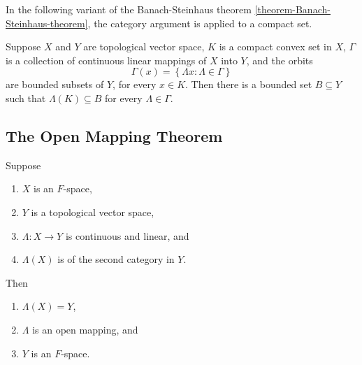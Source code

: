 In the following variant of the Banach-Steinhaus theorem \ref{theorem-Banach-Steinhaus-theorem}, the category argument is applied to a compact set.

\begin{theorem}
  Suppose \( X \) and \( Y \) are topological vector space, \( K \) is a compact convex set in \( X \), \( \Gamma \) is a collection of continuous linear mappings of \( X \) into \( Y \), and the orbits
  \[
    \Gamma(x) = \left\lbrace \Lambda x: \Lambda \in \Gamma \right\rbrace
  \]
  are bounded subsets of \( Y \), for every \( x \in K \).
  Then there is a bounded set \( B \subseteq Y \) such that \( \Lambda(K) \subseteq B \) for every \( \Lambda \in \Gamma \).
\end{theorem}

\subsection{The Open Mapping Theorem}
\label{subsection-the-open-mapping-theorem}

\begin{theorem}
  \label{theorem-the-open-mapping-theorem}
  Suppose
  \begin{enumerate}
    \item \( X \) is an \( F \)-space,
    \item \( Y \) is a topological vector space,
    \item \( \Lambda: X \to Y \) is continuous and linear, and
    \item \( \Lambda(X) \) is of the second category in \( Y \).
  \end{enumerate}
  Then
  \begin{enumerate}
    \item \( \Lambda(X) = Y \),
    \item \( \Lambda \) is an open mapping, and
    \item \( Y \) is an \( F \)-space.
  \end{enumerate}
\end{theorem}

